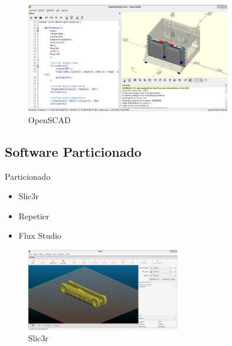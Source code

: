 \documentclass{beamer}
\begin{document}

\begin{frame}
   \begin{figure}[h!]
   	\centering
   	\includegraphics[width=0.8\textwidth]{OpenSCAD.png}
   	\caption{OpenSCAD}
   	\label{openscad}
   	\end{figure}
\end{frame}




\subsection{Software Particionado}


\begin{frame}

	
\begin{block}{Particionado}
	\begin{itemize}
		\item Slic3r
		\item Repetier
		\item Flux Studio
	\end{itemize}



\end{block}

\begin{figure}[h!]
	\centering
	\includegraphics[width=0.6\textwidth]{slic3r.png}
	\caption{Slic3r}
	\label{slic3r}
\end{figure}   

   	
\end{frame}
\end{document}

